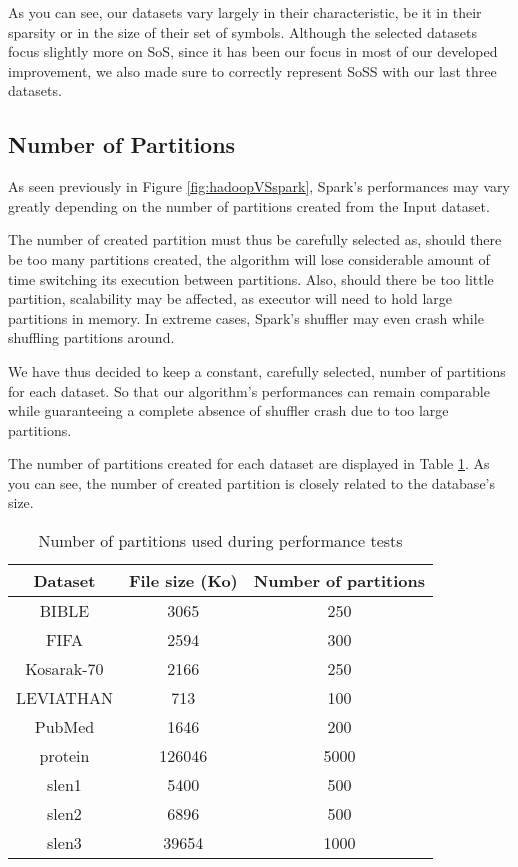\documentclass{eplmastersthesis}
\begin{document}
As you can see, our datasets vary largely in their characteristic, be it in their sparsity or in the size of their set of symbols. Although the selected datasets focus slightly more on \acrlong{SoS}, since it has been our focus in most of our developed improvement, we also made sure to correctly represent \acrlong{SoSS} with our last three datasets. \newline

\subsection{Number of Partitions}

As seen previously in Figure \ref{fig:hadoopVSspark}, Spark's performances may vary greatly depending on the number of partitions created from the Input dataset.\newline

The number of created partition must thus be carefully selected as, should there be too many partitions created, the algorithm will lose considerable amount of time switching its execution between partitions. Also, should there be too little partition, scalability may be affected, as executor will need to hold large partitions in memory. In extreme cases, Spark's shuffler may even crash while shuffling partitions around. \newline

We have thus decided to keep a constant, carefully selected, number of partitions for each dataset. So that our algorithm's performances can remain comparable while guaranteeing a complete absence of shuffler crash due to too large partitions.\newline

The number of partitions created for each dataset are displayed in Table \ref{tab:numPartitions}. As you can see, the number of created partition is closely related to the database's size.

\begin{table}[h]
  \centering
  \begin{tabular}{| c | c | c |}
  	\hline
  	Dataset & File size (Ko) & Number of partitions \\
  	\hline
  	BIBLE & 3065 & 250 \\
  	\hline
  	FIFA & 2594 &300\\
  	\hline
  	Kosarak-70 & 2166 & 250\\
  	\hline  
  	LEVIATHAN & 713 & 100\\
  	\hline
  	PubMed & 1646 & 200\\
  	\hline
  	protein & 126046 & 5000\\
  	\hline
  	slen1 & 5400 & 500\\
 	\hline 
  	slen2 & 6896 & 500\\
  	\hline
  	slen3 & 39654 & 1000\\
  	\hline
  \end{tabular}
  \caption{Number of partitions used during performance tests}
  \label{tab:numPartitions}
\end{table}
\end{document}
